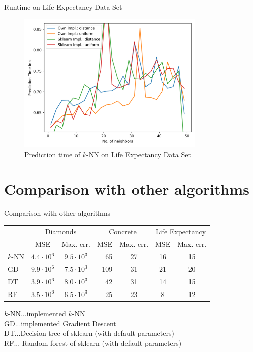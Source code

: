 \documentclass[10pt]{beamer}
\begin{document}
    \begin{frame}{Runtime on Life Expectancy Data Set}
        \begin{figure}[h!]
            \centering
            \includegraphics[width=0.8\textwidth]{exercise_2/presentation/figures/le_knn_scores_runtime.png}
            \caption{Prediction time of $k$-NN on Life Expectancy Data Set}
            \label{fig:kNN_LE_runtime}
        \end{figure}    
    \end{frame}

\section[Comparison with other algorithms]{Comparison with other algorithms}
    \begin{frame}[fragile]{Comparison with other algorithms}
        \begin{tabular}{l|c|c|r|c|c|c}
             \multirow{2}{*}{}& \multicolumn{2}{c|}{Diamonds} & \multicolumn{2}{c|}{Concrete} & \multicolumn{2}{c}{Life Expectancy} \\
             & MSE & Max. err. & MSE & Max. err. & MSE & Max. err. \\
                \hline
            $k$-NN & $4.4 \cdot 10^6$ & $9.5 \cdot 10^3$ & 65 & 27 & 16 & 15 \\
                \hline
            GD & $9.9 \cdot 10^6$ & $7.5 \cdot 10^3$ & 109 & 31 & 21 & 20 \\
                \hline
            DT & $3.9\cdot 10^6$ & $8.0 \cdot 10^3$ & 42 & 31 & 14 & 15 \\
                \hline
            RF & $3.5 \cdot 10^6$ & $6.5 \cdot 10^3$ & 25 & 23 & 8 & 12 \\
        \end{tabular}
        
        $k$-NN...implemented $k$-NN \\
        GD...implemented Gradient Descent \\
        DT...Decision tree of sklearn (with default parameters) \\
        RF... Random forest of sklearn (with default parameters)
    \end{frame}
    
\end{document}
